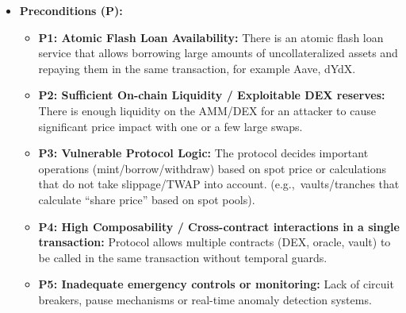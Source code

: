 \begin{itemize}
    \item \textbf{Preconditions (P):}
    \begin{itemize}
        \item \textbf{P1: Atomic Flash Loan Availability:} There is an atomic flash loan service that allows borrowing large amounts of uncollateralized assets and repaying them in the same transaction, for example Aave, dYdX.
        \item \textbf{P2: Sufficient On-chain Liquidity / Exploitable DEX reserves:} There is enough liquidity on the AMM/DEX for an attacker to cause significant price impact with one or a few large swaps.
        \item \textbf{P3: Vulnerable Protocol Logic:} The protocol decides important operations (mint/borrow/withdraw) based on spot price or calculations that do not take slippage/TWAP into account. (e.g.,\ vaults/tranches that calculate “share price” based on spot pools).
        \item \textbf{P4: High Composability / Cross-contract interactions in a single transaction:} Protocol allows multiple contracts (DEX, oracle, vault) to be called in the same transaction without temporal guards.
        \item \textbf{P5: Inadequate emergency controls or monitoring:} Lack of circuit breakers, pause mechanisms or real-time anomaly detection systems.
    \end{itemize}


\end{itemize}
